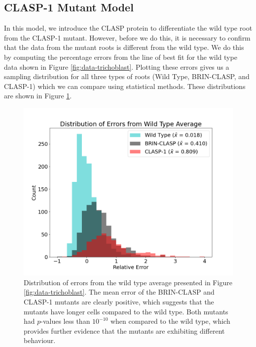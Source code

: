 \subsection{CLASP-1 Mutant Model}

In this model, we introduce the CLASP protein to differentiate the wild type root from the CLASP-1 mutant. However, before we do this, it is necessary to confirm that the data from the mutant roots is different from the wild type. We do this by computing the percentage errors from the line of best fit for the wild type data shown in Figure \ref{fig:data-trichoblast}. Plotting these errors gives us a sampling distribution for all three types of roots (Wild Type, BRIN-CLASP, and CLASP-1) which we can compare using statistical methods.  These distributions are shown in Figure \ref{fig:trichoblast-distribution}.

\begin{figure}
    \centering
    \includegraphics[width=13cm]{img/trichoblast-distribution.png}
    \caption{Distribution of errors from the wild type average presented in Figure \ref{fig:data-trichoblast}. The mean error of the BRIN-CLASP and CLASP-1 mutants are clearly positive, which suggests that the mutants have longer cells compared to the wild type. Both mutants had $p$-values less than $10^{-10}$ when compared to the wild type, which provides further evidence that the mutants are exhibiting different behaviour. }
    \label{fig:trichoblast-distribution}
\end{figure}


\medskip

